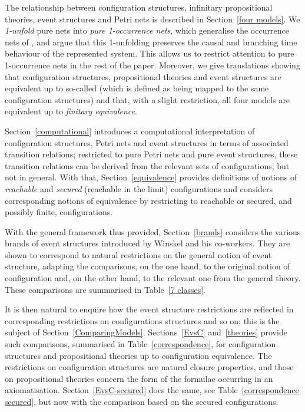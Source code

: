 \documentclass[twocolumn]{article}
\newcommand{\phrase}[1]{\index{#1}{\em #1}}		\newcommand{\implies}{\Rightarrow}
\begin{document}
The relationship between configuration structures, infinitary
propositional theories, event structures and Petri nets is described
in Section~\ref{four models}. We \emph{1-unfold} pure nets
into \emph{pure 1-occurrence nets}, which generalise the occurrence
nets of \cite{NPW81}, and argue that this 1-unfolding preserves the
causal and branching time behaviour of the represented system. This
allows us to restrict attention to pure 1-occurrence nets in the rest
of the paper.  Moreover, we give translations showing that
configuration structures, propositional theories and event structures
are equivalent up to so-called \phrase{configuration equivalence}
(which is defined as being mapped to the same configuration
structures) and that, with a slight restriction, all four models are
equivalent up to \emph{finitary equivalence}.

Section~\ref{computational} introduces a computational interpretation
of configuration structures, Petri nets and event structures in terms
of associated transition relations;
restricted to pure Petri nets and pure event structures, these
transition relations can be derived from the relevant sets of
configurations, but not in general.  With that,
Section~\ref{equivalence} provides definitions of notions
of \emph{reachable} and \emph{secured}
(reachable in the limit) configurations and considers corresponding
notions of equivalence by restricting to reachable or secured, and
possibly finite, configurations.

With the general framework thus provided, Section~\ref{brands} considers
the various brands of event structures introduced by Winskel and his
co-workers. They are shown to correspond to natural restrictions on
the general notion of event structure, adapting the comparisons, on the
one hand, to the original notion of configuration and, on the other
hand, to the relevant one from the general theory. These comparisons
are summarised in Table~\ref{7 classes}.

It is then natural to enquire how the event structure restrictions are
reflected in corresponding restrictions on configurations structures
and so on; this is the subject of Section~\ref{ComparingModels}.
Sections~\ref{EvsC} and~\ref{theories} provide such comparisons,
summarised in Table~\ref{correspondence}, for configuration structures
and propositional theories up to configuration equivalence.  The
restrictions on configuration structures are natural closure
properties, and those on propositional theories concern the form of
the formulae occurring in an axiomatisation. Section~\ref{EvsC-secured}
does the same, see Table~\ref{correspondence secured}, but now with
the comparison based on the secured configurations.
\end{document}
